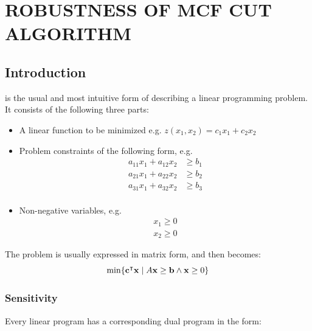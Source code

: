 \chapter{ROBUSTNESS OF MCF CUT ALGORITHM} \label{ch:robustness}%

\section{Introduction} \label{sec:robustness introduction} %

 is the usual and most intuitive form of describing a linear programming problem. It consists of the following three parts:
\begin{itemize}
\item A linear  function to be minimized
e.g. $ z(x_{1},x_{2}) = c_1 x_1 + c_2 x_2$
\item Problem constraints of the following form, e.g.
\begin{equation}
\begin{matrix}
  a_{11} x_1 + a_{12} x_2 &\geq b_1 \\
  a_{21} x_1 + a_{22} x_2 &\geq b_2 \\
  a_{31} x_1 + a_{32} x_2 &\geq b_3 \\
\end{matrix}\end{equation}
\item Non-negative variables, e.g.
\begin{equation}\begin{matrix}
 x_1 \geq 0 \\
 x_2 \geq 0
\end{matrix}\end{equation}
\end{itemize}

The problem is usually expressed in matrix form, and then becomes:
\begin{equation}
\min \{ %
\mathbf{c} \transpose
\mathbf{x} \;|\;
 A \mathbf{x} \geq \mathbf{b} \land \mathbf{x} \geq 0 \}
\end{equation}

\subsection{Sensitivity} \label{sec:sensitivity}

Every linear program has a corresponding dual program in the form:

